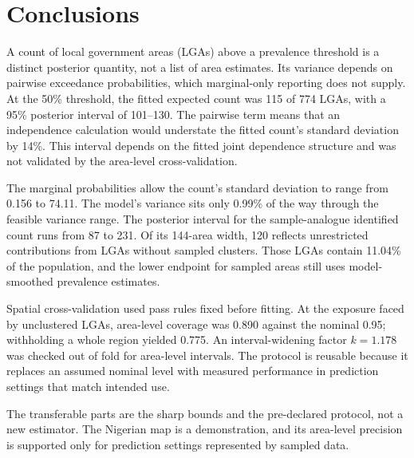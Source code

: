 \section{Conclusions}

A count of local government areas (LGAs) above a prevalence threshold is a distinct posterior quantity, not a list of area estimates. Its variance depends on pairwise exceedance probabilities, which marginal-only reporting does not supply. At the 50\% threshold, the fitted expected count was 115 of 774 LGAs, with a 95\% posterior interval of 101--130. The pairwise term means that an independence calculation would understate the fitted count's standard deviation by 14\%. This interval depends on the fitted joint dependence structure and was not validated by the area-level cross-validation.

The marginal probabilities allow the count's standard deviation to range from 0.156 to 74.11. The model's variance sits only 0.99\% of the way through the feasible variance range. The posterior interval for the sample-analogue identified count runs from 87 to 231. Of its 144-area width, 120 reflects unrestricted contributions from LGAs without sampled clusters. Those LGAs contain 11.04\% of the population, and the lower endpoint for sampled areas still uses model-smoothed prevalence estimates.

Spatial cross-validation used pass rules fixed before fitting. At the exposure faced by unclustered LGAs, area-level coverage was 0.890 against the nominal 0.95; withholding a whole region yielded 0.775. An interval-widening factor \(k=1.178\) was checked out of fold for area-level intervals. The protocol is reusable because it replaces an assumed nominal level with measured performance in prediction settings that match intended use.

The transferable parts are the sharp bounds and the pre-declared protocol, not a new estimator. The Nigerian map is a demonstration, and its area-level precision is supported only for prediction settings represented by sampled data.
